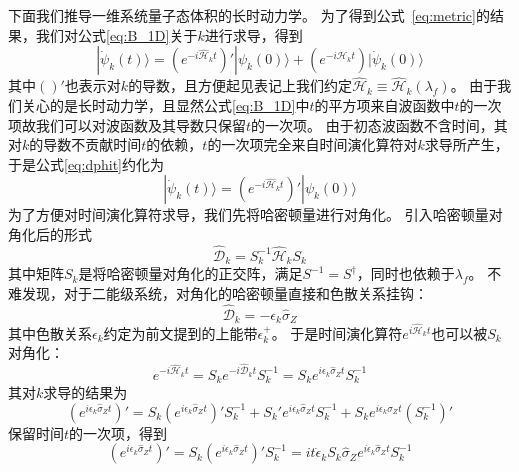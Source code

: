 			下面我们推导一维系统量子态体积的长时动力学。
			为了得到公式~\eqref{eq:metric}的结果，我们对公式\eqref{eq:B_1D}关于$k$进行求导，得到
			\begin{equation}\label{eq:dphit}
				|\dot{\psi}_k(t)\rangle = (e^{-i\hat{\mathcal{H}}_k t})'|\psi_k(0)\rangle + 
				(e^{-i\hat{\mathcal{H}}_k t})|\dot{\psi}_k(0)\rangle
			\end{equation}
			其中$()'$也表示对$k$的导数，且方便起见表记上我们约定$\hat{\mathcal{H}}_k \equiv \hat{\mathcal{H}}_k(\lambda_f)$。
			由于我们关心的是长时动力学，且显然公式\eqref{eq:B_1D}中$t$的平方项来自波函数中$t$的一次项故我们可以对波函数及其导数只保留$t$的一次项。
			由于初态波函数不含时间，其对$k$的导数不贡献时间$t$的依赖，$t$的一次项完全来自时间演化算符对$k$求导所产生，于是公式\eqref{eq:dphit}约化为
			\begin{equation}\label{eq:dphit_reduced}
				|\dot{\psi}_k(t)\rangle = (e^{-i\hat{\mathcal{H}}_k t})'|\psi_k(0)\rangle
			\end{equation}
			为了方便对时间演化算符求导，我们先将哈密顿量进行对角化。
			引入哈密顿量对角化后的形式
			\begin{equation}\label{eq:diag}
				\hat{\mathcal{D}}_k = S_k^{-1} \hat{\mathcal{H}}_k S_k
			\end{equation}
			其中矩阵$S_k$是将哈密顿量对角化的正交阵，满足$S^{-1} = S^\dagger$，同时也依赖于$\lambda_f$。
			不难发现，对于二能级系统，对角化的哈密顿量直接和色散关系挂钩：
			\begin{equation}\label{eq:Dk}
				\hat{\mathcal{D}}_k = -\epsilon_k \hat{\sigma}_Z
			\end{equation}
			其中色散关系$\epsilon_k$约定为前文提到的上能带$\epsilon_k^+$。
			于是时间演化算符$e^{i\hat{\mathcal{H}}_k t}$也可以被$S_k$对角化：
			\begin{equation}
				e^{-i\hat{\mathcal{H}}_k t} = S_k e^{-i\hat{\mathcal{D}}_k t} S_k^{-1} = S_k e^{i\epsilon_k \hat{\sigma}_Z t} S_k^{-1}
			\end{equation}
			其对$k$求导的结果为
			\begin{equation}
				(e^{i\epsilon_k \hat{\sigma}_Z t})' = S_k (e^{i\epsilon_k \hat{\sigma}_Z t})' S_k^{-1} + S_k' e^{i\epsilon_k \hat{\sigma}_Z t} S_k^{-1} + S_k e^{i\epsilon_k \hat{\sigma}_Z t} (S_k^{-1})'
			\end{equation}
			保留时间$t$的一次项，得到
			\begin{equation}
				(e^{i\epsilon_k \hat{\sigma}_Z t})' = S_k (e^{i\epsilon_k \hat{\sigma}_Z t})' S_k^{-1} = i t \dot{\epsilon}_k S_k \hat{\sigma}_Z e^{i\epsilon_k \hat{\sigma}_Z t} S_k^{-1}
			\end{equation}
